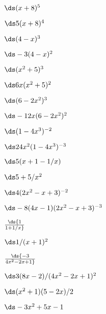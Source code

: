 \begin{enumialphparenastyle}
\begin{ex}  $\ds (x+8)^5$
\begin{sol} 
$\ds 5(x+8)^4$
\end{sol}
\end{ex}

\begin{ex}  $\ds (4-x)^3$
\begin{sol} 
$\ds -3(4-x)^2$
\end{sol}
\end{ex}

\begin{ex}  $\ds (x^2+5)^3$
\begin{sol} 
$\ds 6x(x^2+5)^2$
\end{sol}
\end{ex}

\begin{ex}  $\ds (6-2x^2)^3$
\begin{sol} 
$\ds -12x(6-2x^2)^2$
\end{sol}
\end{ex}

\begin{ex}  $\ds (1-4x^3)^{-2}$
\begin{sol} 
$\ds 24x^2(1-4x^3)^{-3}$
\end{sol}
\end{ex}

\begin{ex}  $\ds 5(x+1-1/x)$
\begin{sol} 
$\ds 5+5/x^2$
\end{sol}
\end{ex}

\begin{ex}  $\ds 4(2x^2-x+3)^{-2}$
\begin{sol} 
$\ds -8(4x-1)(2x^2-x+3)^{-3}$
\end{sol}
\end{ex}

\begin{ex}  $\ds {1\over 1+1/x}$
\begin{sol} 
$\ds 1/(x+1)^2$
\end{sol}
\end{ex}

\begin{ex}  $\ds {-3\over 4x^2-2x+1}$
\begin{sol} 
$\ds 3(8x-2)/(4x^2-2x+1)^2$
\end{sol}
\end{ex}

\begin{ex}  $\ds (x^2+1)(5-2x)/2$
\begin{sol} 
$\ds -3x^2+5x-1$
\end{sol}
\end{ex}


\end{enumialphparenastyle}
